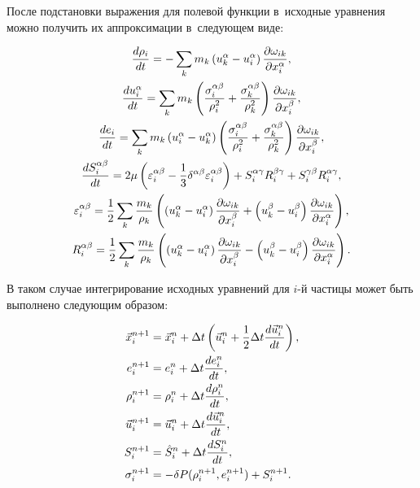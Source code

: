 \documentclass[thesis.tex]{subfiles}
\begin{document}
После подстановки выражения для полевой функции в~исходные уравнения можно получить их аппроксимации в~следующем виде:
\begin{small}
\begin{gather}
    \frac{d\rho_i}{dt} = -\sum_k m_k \left( u_k^\alpha - u_i^\alpha \right) \frac{\partial{\omega_{ik}}}{\partial{x_i^\alpha}}, \nonumber \\
    \frac{du_i^\alpha}{dt} = \sum_k m_k \left( \frac{\sigma_i^{\alpha\beta}}{\rho_i^2}+\frac{\sigma_k^{\alpha\beta}}{\rho_k^2} \right) \frac{\partial{\omega_{ik}}}{\partial{x_i^\beta}},  \nonumber \\
    \frac{de_i}{dt} = \sum_k m_k \left( u_i^\alpha - u_k^\alpha \right) \left( \frac{\sigma_i^{\alpha\beta}}{\rho_i^2}+\frac{\sigma_k^{\alpha\beta}}{\rho_k^2} \right) \frac{\partial{\omega_{ik}}}{\partial{x_i^\beta}},  \nonumber \\
    \frac{dS_i^{\alpha\beta}}{dt} = 2\mu \left( \varepsilon_i^{\alpha\beta} - \frac{1}{3}\delta^{\alpha\beta}\varepsilon_i^{\alpha\beta} \right)  +
                              S_i^{\alpha\gamma}R_i^{\beta\gamma} + S_i^{\gamma\beta}R_i^{\alpha\gamma}, \nonumber \\
    \varepsilon_i^{\alpha\beta} = \frac{1}{2}\sum_k \frac{m_k}{\rho_k} \left(
                                  \left( u_k^\alpha - u_i^\alpha \right)\frac{\partial{\omega_{ik}}}{\partial{x_i^\beta}} +
                                  \left( u_k^\beta - u_i^\beta \right)\frac{\partial{\omega_{ik}}}{\partial{x_i^\alpha}} \right), \nonumber \\
    R_i^{\alpha\beta} = \frac{1}{2}\sum_k \frac{m_k}{\rho_k} \left(
                        \left( u_k^\alpha - u_i^\alpha \right)\frac{\partial{\omega_{ik}}}{\partial{x_i^\beta}} -
                        \left( u_k^\beta - u_i^\beta \right)\frac{\partial{\omega_{ik}}}{\partial{x_i^\alpha}} \right).
\end{gather}
\end{small}

В таком случае интегрирование исходных уравнений для $i$-й частицы может быть выполнено следующим образом:
\begin{small}
\begin{align}
    \vec x_i^{n+1} &= \vec x_i^{n} + \Delta t \left( \vec u_i^n + \frac{1}{2}\Delta t \frac{d\vec u_i^n}{dt} \right), \nonumber \\
    e_i^{n+1} &= e_i^n + \Delta t \frac{de_i^n}{dt}, \nonumber \\
    \rho_i^{n+1} &= \rho_i^n + \Delta t \frac{d\rho_i^n}{dt}, \nonumber \\
    \vec u_i^{n+1} &= \vec u_i^n + \Delta t \frac{d\vec u_i^n}{dt}, \nonumber \\
    S_i^{n+1} &= \hat S_i^n + \Delta t \frac{dS_i^n}{dt}, \nonumber \\
    \sigma_i^{n+1} &= -\delta P(\rho_i^{n+1}, e_i^{n+1}) + S_i^{n+1}.
\end{align}
\end{small}
\end{document}
